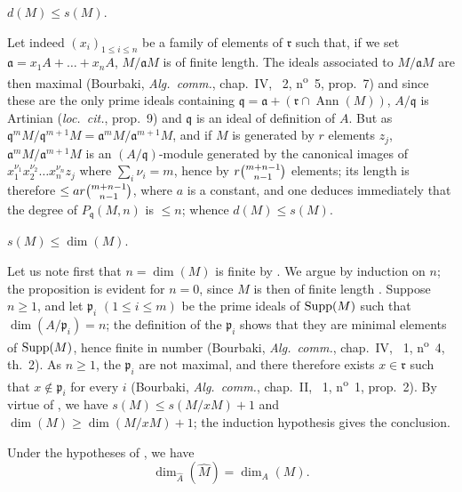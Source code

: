 \begin{env}[16.2.3.3]
\label{0.16.2.3.3}
$d(M)\leq s(M)$.
\end{env}

Let indeed $(x_i)_{1\leq i\leq n}$ be a family of elements of $\mathfrak{r}$ such that, if we set $\mathfrak{a}=x_1A+\ldots+x_n A$, $M/\mathfrak{a}M$ is of finite length.
The ideals associated to $M/\mathfrak{a}M$ are then maximal (Bourbaki, \emph{Alg.~comm.}, chap.~IV, \textsection~2, n\textsuperscript{o}~5, prop.~7) and since these are the only prime ideals containing $\mathfrak{q}=\mathfrak{a}+(\mathfrak{r}\cap\operatorname{Ann}(M))$, $A/\mathfrak{q}$ is Artinian (\emph{loc.~cit.}, prop.~9) and $\mathfrak{q}$ is an ideal of definition of $A$.
But as $\mathfrak{q}^m M/\mathfrak{q}^{m+1}M=\mathfrak{a}^m M/\mathfrak{a}^{m+1}M$, and if $M$ is generated by $r$ elements $z_j$, $\mathfrak{a}^m M/\mathfrak{a}^{m+1}M$ is an $(A/\mathfrak{q})$-module generated by the canonical images of $x_1^{\nu_1}x_2^{\nu_2}\ldots x_n^{\nu_n}z_j$ where $\sum_i\nu_i=m$, hence by $r\binom{m+n- 1}{n- 1}$ elements; its length is therefore $\leq ar\binom{m+n- 1}{n- 1}$, where $a$ is a constant, and one deduces immediately that the degree of $P_\mathfrak{q}(M,n)$ is $\leq n$; whence $d(M)\leq s(M)$.

\begin{env}[16.2.3.4]
\label{0.16.2.3.4}
$s(M)\leq\dim(M)$.
\end{env}

Let us note first that $n=\dim(M)$ is finite by .
We argue by induction on $n$; the proposition is evident for $n=0$, since $M$ is then of finite length .
Suppose $n\geq 1$, and let $\mathfrak{p}_i$ $(1\leq i\leq m)$ be the prime ideals of $\operatorname{Supp}(M)$ such that $\dim(A/\mathfrak{p}_i)=n$; the definition of the $\mathfrak{p}_i$ shows that they are minimal elements of $\operatorname{Supp}(M)$, hence finite in number (Bourbaki, \emph{Alg.~comm.}, chap.~IV, \textsection~1, n\textsuperscript{o}~4, th.~2).
As $n\geq 1$, the $\mathfrak{p}_i$ are not maximal, and there therefore exists $x\in\mathfrak{r}$ such that $x\notin\mathfrak{p}_i$ for every $i$ (Bourbaki, \emph{Alg.~comm.}, chap.~II, \textsection~1, n\textsuperscript{o}~1, prop.~2).
By virtue of , we have $s(M)\leq s(M/x M)+1$ and $\dim(M)\geq\dim(M/x M)+1$; the induction hypothesis gives the conclusion.

\begin{corollary}[16.2.4]
\label{0.16.2.4}
Under the hypotheses of , we have
\begin{equation}
\label{0.16.2.4.1}
\tag{16.2.4.1}
  \dim_{\widehat{A}}(\widehat{M})=\dim_A(M).
\end{equation}
\end{corollary}

